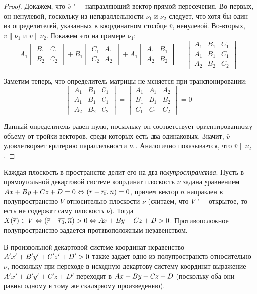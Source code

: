 \begin{proof}
	Докажем, что $\overline{v}$ "--- направляющий вектор прямой пересечения. Во-первых, он ненулевой, поскольку из непараллельности $\nu_1$ и $\nu_2$ следует, что хотя бы один из определителей, указанных в координатном столбце $\overline{v}$, ненулевой. Во-вторых, $\overline{v} \parallel \nu_1$ и $\overline{v} \parallel \nu_2$. Покажем это на примере $\nu_1$:
	\[A_1\begin{vmatrix}B_1&C_1\\B_2&C_2\end{vmatrix}+
	B_1\begin{vmatrix}C_1&A_1\\C_2&A_2\end{vmatrix}+
	A_1\begin{vmatrix}A_1&B_1\\A_2&B_2\end{vmatrix} = 
	\begin{vmatrix}A_1&B_1&C_1\\A_1&B_1&C_1\\A_2&B_2&C_2\end{vmatrix}\]
	
	Заметим теперь, что определитель матрицы не меняется при транспонировании:
	\[\begin{vmatrix}A_1&B_1&C_1\\A_1&B_1&C_1\\A_2&B_2&C_2\end{vmatrix} = \begin{vmatrix}A_1&A_1&A_2\\B_1&B_1&B_2\\C_1&C_1&C_2\end{vmatrix} = 0\]
	
	Данный определитель равен нулю, поскольку он соответствует ориентированному объему от тройки векторов, среди которых есть два одинаковых. Значит, $\overline{v}$ удовлетворяет критерию параллельности $\nu_1$. Аналогично показывается, что $\overline{v} \parallel \nu_2$.
\end{proof}

\begin{note}
	Каждая плоскость в пространстве делит его на два \textit{полупространства}. Пусть в прямоугольной декартовой системе координат плоскость $\nu$ задана уравнением $Ax+By+Cz+D = 0 \Leftrightarrow (\overline{r} \hm{-} \overline{r_0}, \overline{n}) = 0$, причем вектор $\overline{n}$ направлен в полупространство $V$ относительно плоскости $\nu$ (считаем, что $V$ "--- открытое, то есть не содержит саму плоскость $\nu$). Тогда $X(\overline{r}) \in V \Leftrightarrow (\overline{r} \hm{-} \overline{r_0}, \overline{n}) > 0 \hm{\Leftrightarrow} Ax+By+Cz+D > 0$. Противоположное полупространство задается противоположным неравенством.
	
	В произвольной декартовой системе координат неравенство $A'x'\hm{+}B'y'+C'z' +D' > 0$ также задает одно из полупространств относительно $\nu$, поскольку при переходе в исходную декартову систему координат выражение $A'x'+B'y'+C'z+D'$ переходит в $Ax\hm{+}By+Cz+D$ (поскольку оба они равны одному и тому же скалярному произведению).
\end{note}

